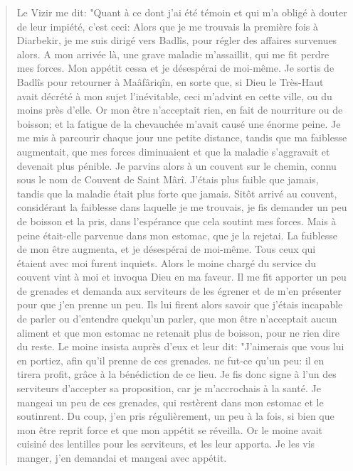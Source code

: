 \begin{quote}
    Le Vizir me dit: "Quant à ce dont j'ai été témoin et qui m'a obligé à douter
de leur impiété, c'est ceci: Alors que je me trouvais la première fois à Diarbekir, je
me suis dirigé vers Badlîs, pour régler des affaires survenues alors.
A mon arrivée là, une grave maladie m'assaillit, qui me fit perdre mes
forces. Mon appétit cessa et je désespérai de moi-même. Je sortis de Badlîs pour
retourner à Maâfâriqîn, en sorte que, si Dieu le Très-Haut avait décrété à mon
sujet l'inévitable, ceci m'advint en cette ville, ou du moins près d'elle.
Or mon être n'acceptait rien, en fait de nourriture ou de boisson; et la
fatigue de la chevauchée m'avait causé une énorme peine. Je me mis à parcourir
chaque jour une petite distance, tandis que ma faiblesse augmentait, que mes forces
diminuaient et que la maladie s'aggravait et devenait plus pénible.
Je parvins alors à un couvent sur le chemin, connu sous le nom de Couvent
de Saint Mârî. J'étais plus faible que jamais, tandis que la maladie était plus forte
que jamais.
Sitôt arrivé au couvent, considérant la faiblesse dans laquelle je me
trouvais, je fis demander un peu de boisson et la pris, dans l'espérance que cela
soutint mes forces. Mais à peine était-elle parvenue dans mon estomac, que je la
rejetai. La faiblesse de mon être augmenta, et je désespérai de moi-même. Tous
ceux qui étaient avec moi furent inquiets.
Alors le moine chargé du service du couvent vint à moi et invoqua Dieu en
ma faveur. Il me fit apporter un peu de grenades et demanda aux serviteurs de les
égrener et de m'en présenter pour que j'en prenne un peu. Ils lui firent alors savoir
que j'étais incapable de parler ou d'entendre quelqu'un parler, que mon être
n'acceptait aucun aliment et que mon estomac ne retenait plus de boisson, pour ne
rien dire du reste.
Le moine insista auprès d'eux et leur dit: "J'aimerais que vous lui en
portiez, afin qu'il prenne de ces grenades. ne fut-ce qu'un peu: il en tirera profit,
grâce à la bénédiction de ce lieu.
Je fis donc signe à l'un des serviteurs d'accepter sa proposition, car je
m'accrochais à la santé. Je mangeai un peu de ces grenades, qui restèrent dans mon
estomac et le soutinrent. Du coup, j'en pris régulièrement, un peu à la fois, si bien
que mon être reprit force et que mon appétit se réveilla.
Or le moine avait cuisiné des lentilles pour les serviteurs, et les leur
apporta. Je les vis manger, j'en demandai et mangeai avec appétit. 
\end{quote}
